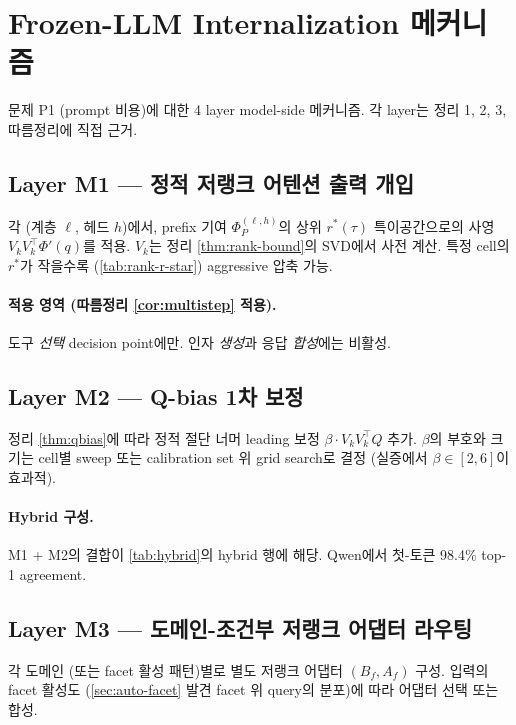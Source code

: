 \documentclass[11pt]{article}
\theoremstyle{definition}
\newcommand{\Phip}{\Phi_P}
\begin{document}
\section{Frozen-LLM Internalization 메커니즘}
\label{sec:internalization}

문제 P1 (prompt 비용)에 대한 4 layer model-side 메커니즘. 각 layer는 정리 1, 2, 3, 따름정리에 직접 근거.

\subsection{Layer M1 — 정적 저랭크 어텐션 출력 개입}
\label{sec:layer-m1}

각 (계층 $\ell$, 헤드 $h$)에서, prefix 기여 $\Phip^{(\ell,h)}$의 상위 $r^*(\tau)$ 특이공간으로의 사영 $V_k V_k^\top \Phi'(q)$를 적용. $V_k$는 정리 \ref{thm:rank-bound}의 SVD에서 사전 계산. 특정 cell의 $r^*$가 작을수록 (\cref{tab:rank-r-star}) aggressive 압축 가능.

\paragraph{적용 영역 (따름정리 \ref{cor:multistep} 적용).}
도구 \emph{선택} decision point에만. 인자 \emph{생성}과 응답 \emph{합성}에는 비활성.

\subsection{Layer M2 — Q-bias 1차 보정}
\label{sec:layer-m2}

정리 \ref{thm:qbias}에 따라 정적 절단 너머 leading 보정 $\beta \cdot V_k V_k^\top Q$ 추가. $\beta$의 부호와 크기는 cell별 sweep 또는 calibration set 위 grid search로 결정 (실증에서 $\beta \in [2, 6]$이 효과적).

\paragraph{Hybrid 구성.}
M1 + M2의 결합이 \cref{tab:hybrid}의 hybrid 행에 해당. Qwen에서 첫-토큰 98.4\% top-1 agreement.

\subsection{Layer M3 — 도메인-조건부 저랭크 어댑터 라우팅}
\label{sec:layer-m3}

각 도메인 (또는 facet 활성 패턴)별로 별도 저랭크 어댑터 $(B_f, A_f)$ 구성. 입력의 facet 활성도 (\cref{sec:auto-facet} 발견 facet 위 query의 분포)에 따라 어댑터 선택 또는 합성.
\end{document}
